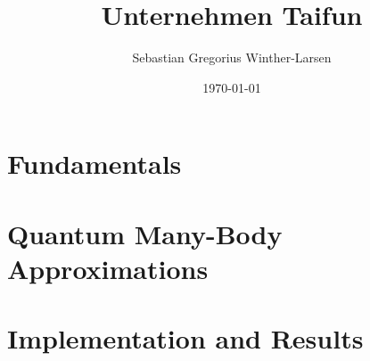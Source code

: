 \documentclass[twoside, english, notitlepage, 10pt]{uiofysmaster}
\author{Sebastian Gregorius Winther-Larsen}
\title{Unternehmen Taifun}
\date{\today}
\begin{document}
\frontmatter
    \maketitle

    \setcounter{tocdepth}{1}
    \tableofcontents
    \listoffigures

\mainmatter

    \part{Fundamentals}

        
        

    \part{Quantum Many-Body Approximations}

        
        
        

    \part{Implementation and Results}

                
        
        

    \appendix

        
        
        
        

    \printbibliography
\end{document}
